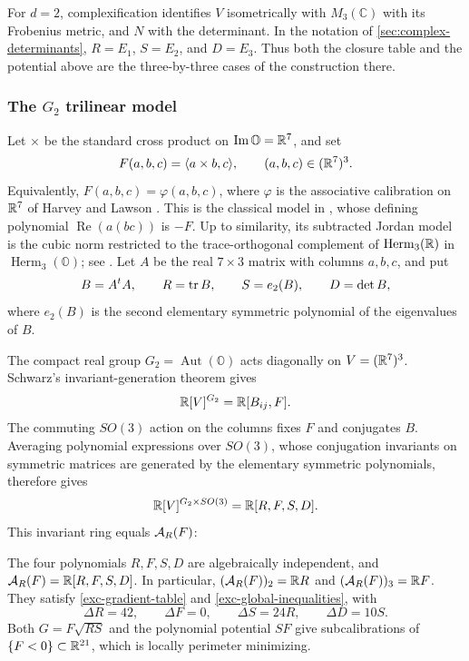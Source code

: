 For \(d=2\), complexification identifies \(V\) isometrically
with \(M_3(\mathbb C)\) with its Frobenius metric, and \(N\)
with the determinant. In the notation of \cref{sec:complex-determinants},
\(R=E_1\), \(S=E_2\), and \(D=E_3\). Thus both the closure
table and the potential above are the three-by-three cases of the
construction there.

\subsubsection{The \texorpdfstring{$G_2$}{G2} trilinear model}
\label{exc-g2-model}

Let \(\times\) be the standard cross product on
\(\operatorname{Im}\mathbb O=\mathbb R^7\), and set
\[
 F(a,b,c)=\langle a\times b,c\rangle,
 \qquad (a,b,c)\in(\mathbb R^7)^3.
\]
Equivalently, \(F(a,b,c)=\varphi(a,b,c)\), where \(\varphi\)
is the associative calibration on \(\mathbb R^7\) of Harvey and Lawson
\cite[Section~IV.1.A]{HarveyLawson82a}.
This is the classical model in
\cite[Section~6.4, equation~(6.26), Proposition~6.3]{TkachevClassification10},
whose defining polynomial \(\operatorname{Re}(a(bc))\) is
\(-F\). Up to similarity, its subtracted Jordan model is the cubic
norm restricted to the trace-orthogonal complement of
\(\operatorname{Herm}_3(\mathbb R)\) in \(\operatorname{Herm}_3(\mathbb O)\);
see \cite[Proposition~6.4.4 and Table~6.4.1]{NadirashviliTkachevVladut14}.
Let \(A\) be the real \(7\times3\) matrix with
columns \(a,b,c\), and put
\[
 B=A^tA,\qquad R=\operatorname{tr} B,\qquad S=e_2(B),\qquad D=\det B,
\]
where \(e_2(B)\) is the second elementary symmetric polynomial
of the eigenvalues of \(B\).

The compact real group \(G_2=\operatorname{Aut}(\mathbb O)\)
acts diagonally on \(V=(\mathbb R^7)^3\). Schwarz's invariant-generation
theorem \cite[Theorem~4 and equations~(5.1)--(5.3)]{Schwarz83} gives
\[
 \mathbb R[V]^{G_2}=\mathbb R[B_{ij},F].
\]
The commuting \(SO(3)\) action on the columns fixes \(F\)
and conjugates \(B\). Averaging polynomial expressions over
\(SO(3)\), whose conjugation invariants on symmetric matrices
are generated by the elementary symmetric polynomials, therefore gives
\[
 \mathbb R[V]^{G_2\times SO(3)}=\mathbb R[R,F,S,D].
\]
This invariant ring equals \(\mathcal A_R(F)\):

\begin{theorem}
\label{thm:exc-g2}
The four polynomials \(R,F,S,D\) are algebraically independent,
and \(\mathcal A_R(F)=\mathbb R[R,F,S,D]\). In particular,
\((\mathcal A_R(F))_2=\mathbb R R\) and \((\mathcal A_R(F))_3=\mathbb R F\).
They satisfy
\eqref{exc-gradient-table} and \eqref{exc-global-inequalities},
with
\begin{equation}\label{exc-g2-laplacians}
 \Delta R=42,\qquad \Delta F=0,\qquad
 \Delta S=24R,\qquad \Delta D=10S.
\end{equation}
Both \(G=F\sqrt{RS}\) and the polynomial potential \(SF\)
give subcalibrations of \(\{F<0\}\subset\mathbb R^{21}\), which is
locally perimeter minimizing.
\end{theorem}

